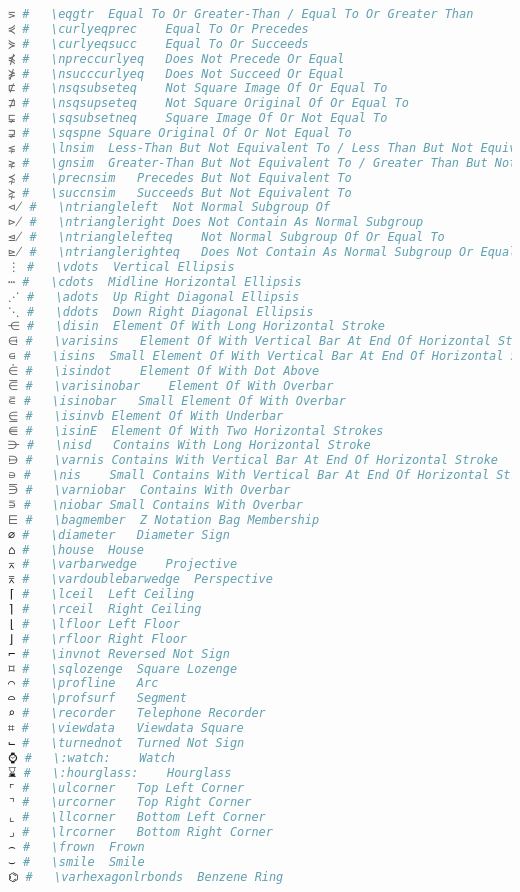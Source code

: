 \begin{lstlisting}[language=Julia, style=julia, linewidth=\textwidth]
⋝ #   \eqgtr  Equal To Or Greater-Than / Equal To Or Greater Than
⋞ #   \curlyeqprec    Equal To Or Precedes
⋟ #   \curlyeqsucc    Equal To Or Succeeds
⋠ #   \npreccurlyeq   Does Not Precede Or Equal
⋡ #   \nsucccurlyeq   Does Not Succeed Or Equal
⋢ #   \nsqsubseteq    Not Square Image Of Or Equal To
⋣ #   \nsqsupseteq    Not Square Original Of Or Equal To
⋤ #   \sqsubsetneq    Square Image Of Or Not Equal To
⋥ #   \sqspne Square Original Of Or Not Equal To
⋦ #   \lnsim  Less-Than But Not Equivalent To / Less Than But Not Equivalent To
⋧ #   \gnsim  Greater-Than But Not Equivalent To / Greater Than But Not Equivalent To
⋨ #   \precnsim   Precedes But Not Equivalent To
⋩ #   \succnsim   Succeeds But Not Equivalent To
⋪ #   \ntriangleleft  Not Normal Subgroup Of
⋫ #   \ntriangleright Does Not Contain As Normal Subgroup
⋬ #   \ntrianglelefteq    Not Normal Subgroup Of Or Equal To
⋭ #   \ntrianglerighteq   Does Not Contain As Normal Subgroup Or Equal
⋮ #   \vdots  Vertical Ellipsis
⋯ #   \cdots  Midline Horizontal Ellipsis
⋰ #   \adots  Up Right Diagonal Ellipsis
⋱ #   \ddots  Down Right Diagonal Ellipsis
⋲ #   \disin  Element Of With Long Horizontal Stroke
⋳ #   \varisins   Element Of With Vertical Bar At End Of Horizontal Stroke
⋴ #   \isins  Small Element Of With Vertical Bar At End Of Horizontal Stroke
⋵ #   \isindot    Element Of With Dot Above
⋶ #   \varisinobar    Element Of With Overbar
⋷ #   \isinobar   Small Element Of With Overbar
⋸ #   \isinvb Element Of With Underbar
⋹ #   \isinE  Element Of With Two Horizontal Strokes
⋺ #   \nisd   Contains With Long Horizontal Stroke
⋻ #   \varnis Contains With Vertical Bar At End Of Horizontal Stroke
⋼ #   \nis    Small Contains With Vertical Bar At End Of Horizontal Stroke
⋽ #   \varniobar  Contains With Overbar
⋾ #   \niobar Small Contains With Overbar
⋿ #   \bagmember  Z Notation Bag Membership
⌀ #   \diameter   Diameter Sign
⌂ #   \house  House
⌅ #   \varbarwedge    Projective
⌆ #   \vardoublebarwedge  Perspective
⌈ #   \lceil  Left Ceiling
⌉ #   \rceil  Right Ceiling
⌊ #   \lfloor Left Floor
⌋ #   \rfloor Right Floor
⌐ #   \invnot Reversed Not Sign
⌑ #   \sqlozenge  Square Lozenge
⌒ #   \profline   Arc
⌓ #   \profsurf   Segment
⌕ #   \recorder   Telephone Recorder
⌗ #   \viewdata   Viewdata Square
⌙ #   \turnednot  Turned Not Sign
⌚ #   \:watch:    Watch
⌛ #   \:hourglass:    Hourglass
⌜ #   \ulcorner   Top Left Corner
⌝ #   \urcorner   Top Right Corner
⌞ #   \llcorner   Bottom Left Corner
⌟ #   \lrcorner   Bottom Right Corner
⌢ #   \frown  Frown
⌣ #   \smile  Smile
⌬ #   \varhexagonlrbonds  Benzene Ring

\end{lstlisting}
